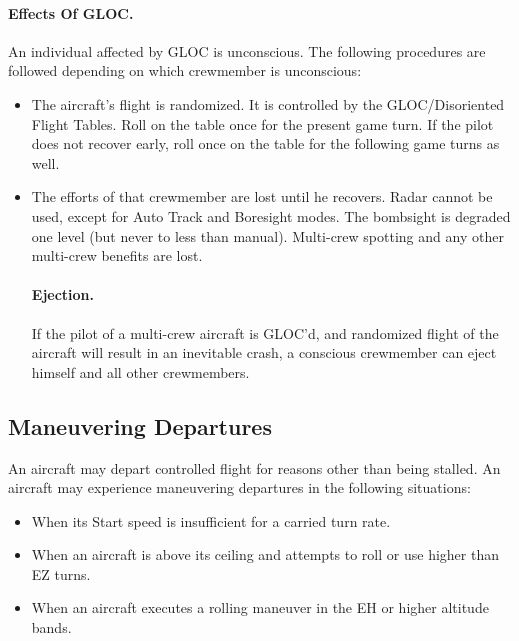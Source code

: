 \paragraph{Effects Of GLOC.} An individual affected by GLOC is unconscious. The following procedures are followed depending on which crewmember is unconscious:

\begin{itemize}

    \item{} The aircraft's flight is randomized. It is controlled by the GLOC/Disoriented Flight Tables. Roll on the table once for the present game turn. If the pilot does not recover early, roll once on the table for the following game turns as well.

    \item{} The efforts of that crewmember are lost until he recovers. Radar cannot be used, except for Auto Track and Boresight modes. The bombsight is degraded one level (but never to less than manual). Multi-crew spotting and any other multi-crew benefits are lost.

    \paragraph{Ejection.} If the pilot of a multi-crew aircraft is GLOC'd, and randomized flight of the aircraft will result in an inevitable crash, a conscious crewmember can eject himself and all other crewmembers.

\end{itemize}

\subsection{Maneuvering Departures}

An aircraft may depart controlled flight for reasons other than being stalled. An aircraft may experience maneuvering departures in the following situations:

\begin{itemize}

    \item When its Start speed is insufficient for a carried turn rate.


    \item When an aircraft is above its ceiling and attempts to roll or use higher than EZ turns.

    \item When an aircraft executes a rolling maneuver in the EH or higher altitude bands.

\end{itemize}

